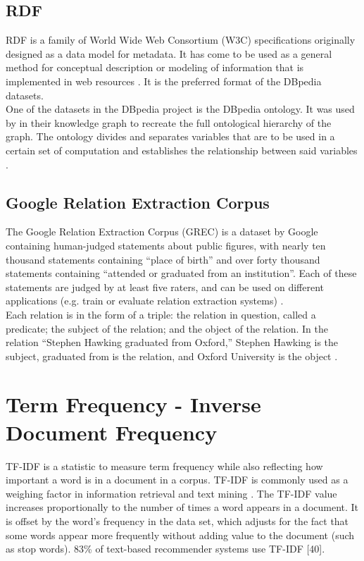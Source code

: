 \documentclass[10pt,11pt,12pt,oneside]{book}
\begin{document}
	\subsection{RDF}
	RDF is a family of World Wide Web Consortium (W3C) specifications originally designed as a data model for metadata. It has come to be used as a general method for conceptual description or modeling of information that is implemented in web resources \cite{dbpedia}. It is the preferred format of the DBpedia datasets.\\[8pt]
	One of the datasets in the DBpedia project is the DBpedia ontology. It was used by \cite{sutton2004collective} in their knowledge graph to recreate the full ontological hierarchy of the graph. The ontology divides and separates variables that are to be used in a certain set of computation and establishes the relationship between said variables \cite{bikakis_tsinaraki_gioldasis_stavrakantonakis}.
	
	\subsection{Google Relation Extraction Corpus}
	The Google Relation Extraction Corpus (GREC) is a dataset by Google containing human-judged statements about public figures, with nearly ten thousand statements containing “place of birth” and over forty thousand statements containing “attended or graduated from an institution”. Each of these statements are judged by at least five raters, and can be used on different applications (e.g. train or evaluate relation extraction systems) \cite{orr_2013}.\\[8pt]
	
	Each relation is in the form of a triple: the relation in question, called a predicate; the subject of the relation; and the object of the relation. In the relation “Stephen Hawking graduated from Oxford,” Stephen Hawking is the subject, graduated from is the relation, and Oxford University is the object \cite{orr_2013}. 
	
	
	\section{Term Frequency - Inverse Document Frequency}
	TF-IDF is a statistic to measure term frequency while also reflecting how important a word is in a document in a corpus. TF-IDF is commonly used as a weighing factor in information retrieval and text mining \cite{skiena1998algorithm}.  The TF-IDF value increases proportionally to the number of times a word appears in a document. It is offset by the word’s frequency in the data set, which adjusts for the fact that some words appear more frequently without adding value to the document (such as stop words). 83\% of text-based recommender systems use TF-IDF [40].
	
\end{document}
